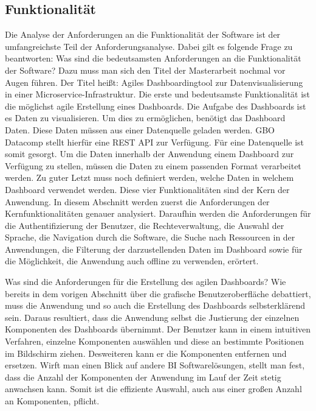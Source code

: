 \subsection{Funktionalität}
\label{subsec:funktionalitaet}
Die Analyse der Anforderungen an die Funktionalität der Software ist der
umfangreichste Teil der Anforderungsanalyse. Dabei gilt es folgende Frage zu beantworten:
Was sind die bedeutsamsten Anforderungen an die Funktionalität der Software?
Dazu muss man sich den Titel der Masterarbeit nochmal vor Augen führen.
Der Titel heißt: Agiles Dashboardingtool zur Datenvisualisierung
in einer Microservice-Infrastruktur. Die erste und bedeutsamste Funktionalität ist
die möglichst agile Erstellung eines Dashboards. Die Aufgabe des Dashboards ist es Daten
zu visualisieren. Um dies zu ermöglichen, benötigt das Dashboard Daten. Diese Daten
müssen aus einer Datenquelle geladen werden. GBO Datacomp stellt hierfür eine REST API
zur Verfügung. Für eine Datenquelle ist somit gesorgt. Um die Daten innerhalb der Anwendung
einem Dashboard zur Verfügung zu stellen, müssen die Daten zu einem passenden Format verarbeitet werden.
Zu guter Letzt muss noch definiert werden, welche Daten in welchem Dashboard verwendet
werden. Diese vier Funktionalitäten sind der Kern der Anwendung. In diesem Abschnitt
werden zuerst die Anforderungen der Kernfunktionalitäten genauer analysiert. Daraufhin werden die Anforderungen
für die Authentifizierung der Benutzer, die Rechteverwaltung, die Auswahl der Sprache,
die Navigation durch die Software, die Suche nach Ressourcen in der Anwendungen,
die Filterung der darzustellenden Daten im Dashboard sowie für die Möglichkeit,
die Anwendung auch offline zu verwenden, erörtert.

Was sind die Anforderungen für die Erstellung des agilen Dashboards? Wie bereits in dem
vorigen Abschnitt über die grafische Benutzeroberfläche debattiert, muss die Anwendung und
so auch die Erstellung des Dashboards selbsterklärend sein. Daraus resultiert, dass die Anwendung 
selbst die Justierung der einzelnen Komponenten des Dashboards übernimmt. Der
Benutzer kann in einem intuitiven Verfahren, einzelne Komponenten auswählen und diese
an bestimmte Positionen im Bildschirm ziehen. Desweiteren kann er die Komponenten
entfernen und ersetzen. Wirft man einen Blick auf andere BI Softwarelösungen,
stellt man fest, dass die Anzahl der Komponenten der Anwendung im Lauf der Zeit
stetig anwachsen kann. Somit ist die effiziente Auswahl, auch aus einer großen
Anzahl an Komponenten, pflicht.

